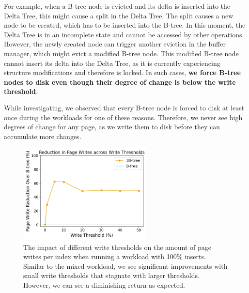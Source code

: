 \begin{enumerate}
For example, when a B-tree node is evicted and its delta is inserted into the Delta Tree, this might cause a split in the Delta Tree.
The split causes a new node to be created, which has to be inserted into the B-tree.
In this moment, the Delta Tree is in an incomplete state and cannot be accessed by other operations.
However, the newly created node can trigger another eviction in the buffer manager, which might evict a modified B-tree node.
This modified B-tree node cannot insert its delta into the Delta Tree, as it is currently experiencing structure modifications and therefore is locked.
In such cases, \textbf{we force B-tree nodes to disk even though their degree of change is below the write threshold}.

While investigating, we observed that every B-tree node is forced to disk at least once during the workloads for one of these reasons.
Therefore, we never see high degrees of change for any page, as we write them to disk before they can accumulate more changes.
\end{enumerate}

\begin{figure}[htbp]
  \centering
  \includegraphics[width=0.6\textwidth]{figures/evaluation/pageviews_insert_write_thresholds.png}
  \caption{The impact of different write thresholds on the amount of page writes per index when running a workload with 100\% inserts. Similar to the mixed workload, we see significant improvements with small write thresholds that stagnate with larger thresholds. However, we can see a diminishing return as expected.}
  \label{fig:write_thresholds_insert}
\end{figure}


